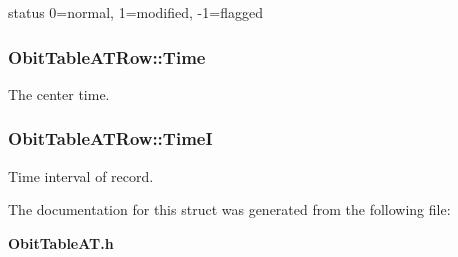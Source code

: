 status 0=normal, 1=modified, -1=flagged 

\subsubsection{ {\bf Obit\-Table\-ATRow::Time}}\label{structObitTableATRow_o6}


The center time. 

\subsubsection{ {\bf Obit\-Table\-ATRow::Time\-I}}\label{structObitTableATRow_o7}


Time interval of record. 



The documentation for this struct was generated from the following file:\begin{CompactItemize}
\item 
{\bf Obit\-Table\-AT.h}\end{CompactItemize}
